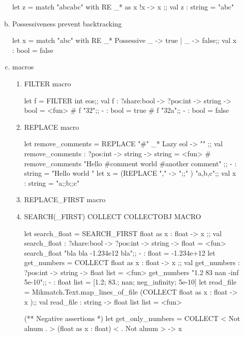 \begin{enumerate}
\begin{enumerate}[(a)]
  \begin{alternate}
let z =  match "abcabc" with RE _* as x !x -> x ;;
val z : string = "abc"    
\end{alternate}

\item Possessiveness prevent backtracking 

  \begin{alternate}
let x = match "abc" with RE _* Possessive _ -> true | _ -> false;;
val x : bool = false    
  \end{alternate}

\item macros
  \begin{enumerate}

\item FILTER macro 
  \begin{alternate}
let f = FILTER int eos;;
val f : ?share:bool -> ?pos:int -> string -> bool = <fun>
# f "32";;
- : bool = true
# f "32a";;
- : bool = false    
\end{alternate}

\item REPLACE macro 
  \begin{alternate}
let remove_comments = REPLACE "#" _* Lazy eol -> "" ;;
val remove_comments : ?pos:int -> string -> string = <fun>
# remove_comments "Hello #comment \n world #another comment" ;;
- : string = "Hello \n world "
let x = (REPLACE "," -> ";;" ) "a,b,c";;
val x : string = "a;;b;;c"
\end{alternate}

\item REPLACE\_FIRST macro
\item SEARCH(\_FIRST) COLLECT COLLECTOBJ MACRO

  \begin{alternate}
let search_float = SEARCH_FIRST float as x : float -> x ;;
val search_float : ?share:bool -> ?pos:int -> string -> float = <fun>
search_float "bla bla -1.234e12 bla";;
- : float = -1.234e+12
let get_numbers = COLLECT float as x : float -> x ;;
val get_numbers : ?pos:int -> string -> float list = <fun>
get_numbers "1.2   83  nan  -inf 5e-10";;
- : float list = [1.2; 83.; nan; neg_infinity; 5e-10]
let read_file = Mikmatch.Text.map_lines_of_file (COLLECT float as x : float -> x );;
val read_file : string -> float list list = <fun>

(** Negative assertions *)
let get_only_numbers =  COLLECT < Not alnum . > (float as x : float) < . Not alnum > -> x


\end{alternate}
\end{enumerate}
\end{enumerate}
\end{enumerate}
